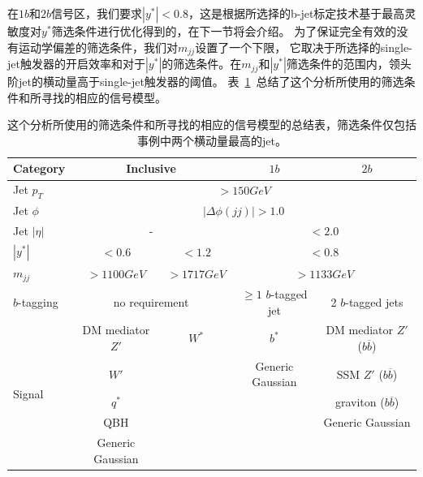 在$1b$和$2b$信号区，我们要求$|y^*|<0.8$，这是根据所选择的b-jet标定技术基于最高灵敏度对$y^*$筛选条件进行优化得到的，在下一节将会介绍。
为了保证完全有效的没有运动学偏差的筛选条件，我们对$m_{jj}$设置了一个下限，
它取决于所选择的single-jet触发器的开启效率和对于$|y^*|$的筛选条件。在$m_{jj}$和$|y^*|$筛选条件的范围内，领头阶jet的横动量高于single-jet触发器的阈值。
表~\ref{tab:selection}~总结了这个分析所使用的筛选条件和所寻找的相应的信号模型。

\begin{table}[htbp]
  \caption{ 这个分析所使用的筛选条件和所寻找的相应的信号模型的总结表，筛选条件仅包括事例中两个横动量最高的jet。}
  \centering
  \begin{tabular}{l|c|c|c|c}
    \hline\hline
    Category & \multicolumn{2}{c|}{Inclusive} & $1b$ & $2b$ \\\hline
    Jet $p_{T}$ & \multicolumn{4}{c}{$>150 GeV$} \\\hline
    Jet $\phi$ & \multicolumn{4}{c}{$|\Delta \phi(jj)|>1.0$} \\\hline
    Jet $|\eta|$& \multicolumn{2}{c|}{-} &  \multicolumn{2}{c}{$<2.0 $} \\\hline
    $|y^*|$ & $<0.6$ &  $<1.2$ &  \multicolumn{2}{c}{$<0.8$} \\\hline
    $m_{jj}$ & $>1100 GeV$ & $>1717 GeV$ & \multicolumn{2}{c}{$>1133 GeV$} \\\hline
    $b$-tagging & \multicolumn{2}{c|}{no requirement} & $\geqslant1$ $b$-tagged jet & 2 $b$-tagged jets \\\hline
    \multirow{5}{*}{Signal} & DM mediator $Z'$ & $W^*$ & $b^*$ & DM mediator $Z'$ ($b\overline{b}$) \\
    &$W'$ & & Generic Gaussian & SSM $Z'$ ($b\overline{b}$) \\
    & $q^*$  & &                 & graviton ($b\overline{b}$) \\
    & QBH    & &                 & Generic Gaussian \\
    & Generic Gaussian & &  & \\\hline
    \hline
  \end{tabular}
  \label{tab:selection}
\end{table}



